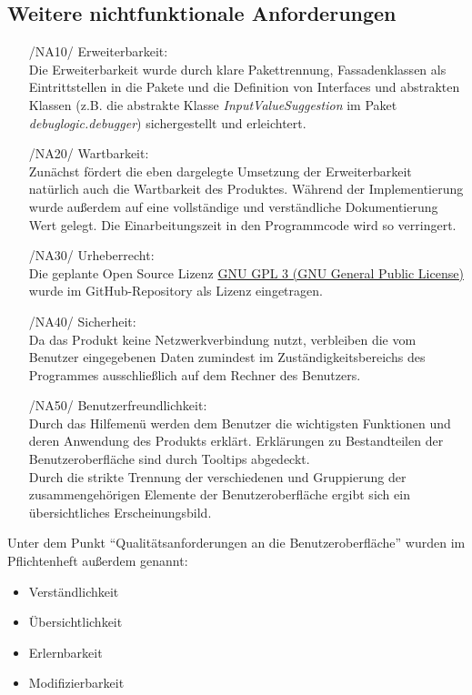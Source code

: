 \documentclass[parskip=full]{scrartcl}
\begin{document}
		\subsection{Weitere nichtfunktionale Anforderungen}
		\begin{itemize}
		\item[/NA10/]Erweiterbarkeit: \\
		Die Erweiterbarkeit wurde durch klare Pakettrennung, Fassadenklassen als Eintrittstellen in die Pakete und die Definition von Interfaces und abstrakten Klassen (z.B. die abstrakte Klasse \textit{InputValueSuggestion} im Paket \textit{debuglogic.debugger}) sichergestellt und erleichtert.
		\item[/NA20/]Wartbarkeit: \\
		Zunächst fördert die eben dargelegte Umsetzung der Erweiterbarkeit natürlich auch die Wartbarkeit des Produktes. Während der Implementierung wurde außerdem auf eine vollständige und verständliche Dokumentierung Wert gelegt. Die Einarbeitungszeit in den Programmcode wird so verringert.
		\item[/NA30/]Urheberrecht: \\
		Die geplante Open Source Lizenz \href{https://www.gnu.org/licenses/gpl-3.0.de.html}{GNU GPL 3 (GNU General Public License)} wurde im GitHub-Repository als Lizenz eingetragen.
		
		\item[/NA40/] Sicherheit: \\
		Da das Produkt keine Netzwerkverbindung nutzt, verbleiben die vom Benutzer eingegebenen Daten zumindest im Zuständigkeitsbereichs des Programmes ausschließlich auf dem Rechner des Benutzers.
		\item[/NA50/]Benutzerfreundlichkeit: \\
		Durch das Hilfemenü werden dem Benutzer die wichtigsten Funktionen und deren Anwendung des Produkts erklärt. Erklärungen zu Bestandteilen der Benutzeroberfläche sind durch Tooltips abgedeckt. \\
		Durch die strikte Trennung der verschiedenen und Gruppierung der zusammengehörigen Elemente der Benutzeroberfläche ergibt sich ein übersichtliches Erscheinungsbild. 
		\end{itemize}
		
				Unter dem Punkt \enquote{Qualitätsanforderungen an die Benutzeroberfläche} wurden im Pflichtenheft außerdem genannt:
				\begin{itemize}
				\item Verständlichkeit \\
				\item Übersichtlichkeit \\
				\item Erlernbarkeit \\
				\item Modifizierbarkeit \\
				
				\end{itemize}
		
\end{document}

